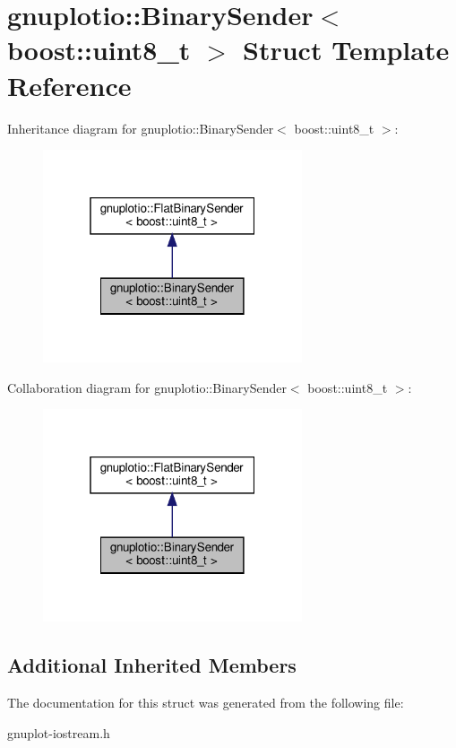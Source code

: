 \hypertarget{structgnuplotio_1_1BinarySender_3_01boost_1_1uint8__t_01_4}{}\section{gnuplotio\+:\+:Binary\+Sender$<$ boost\+:\+:uint8\+\_\+t $>$ Struct Template Reference}
\label{structgnuplotio_1_1BinarySender_3_01boost_1_1uint8__t_01_4}


Inheritance diagram for gnuplotio\+:\+:Binary\+Sender$<$ boost\+:\+:uint8\+\_\+t $>$\+:
\nopagebreak
\begin{figure}[H]
\begin{center}
\leavevmode
\includegraphics[width=217pt]{structgnuplotio_1_1BinarySender_3_01boost_1_1uint8__t_01_4__inherit__graph}
\end{center}
\end{figure}


Collaboration diagram for gnuplotio\+:\+:Binary\+Sender$<$ boost\+:\+:uint8\+\_\+t $>$\+:
\nopagebreak
\begin{figure}[H]
\begin{center}
\leavevmode
\includegraphics[width=217pt]{structgnuplotio_1_1BinarySender_3_01boost_1_1uint8__t_01_4__coll__graph}
\end{center}
\end{figure}
\subsection*{Additional Inherited Members}


The documentation for this struct was generated from the following file\+:\begin{DoxyCompactItemize}
\item 
gnuplot-\/iostream.\+h\end{DoxyCompactItemize}
